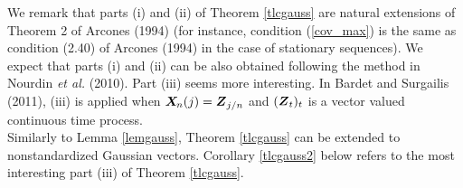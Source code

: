 \documentclass[10pt]{article}
\newcommand{\mbf}[1]{\mbox{\boldmath $#1$}}
\begin{document}
We remark that parts (i) and (ii) of Theorem \ref{tlcgauss} are natural extensions of Theorem 2 of Arcones (1994) (for instance,  condition (\ref{cov_max})
is the same as condition (2.40) of Arcones (1994) in the case of stationary sequences).
We expect that parts (i) and (ii) can be also obtained following the method in Nourdin {\it et al.} (2010).
Part (iii) seems more interesting. In Bardet and Surgailis (2011), (iii) is applied when ${\mbf X}_{\! n}(j)= {\mbf Z}_{j/n}$ and $({\mbf Z}_t)_t$ is a vector valued continuous time process. \\

Similarly to Lemma \ref{lemgauss}, Theorem \ref{tlcgauss} can be extended to nonstandardized Gaussian vectors.
Corollary \ref{tlcgauss2} below refers to the most interesting part (iii) of  Theorem \ref{tlcgauss}.

\end{document}
